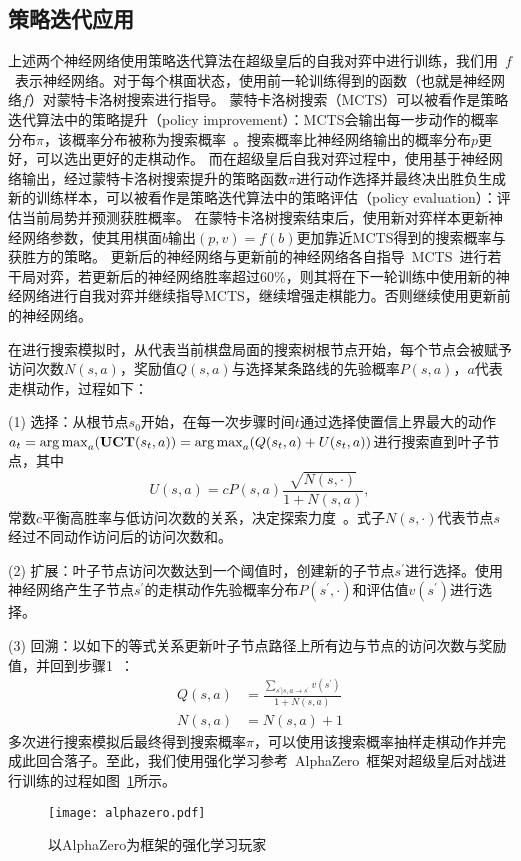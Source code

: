 \subsection{策略迭代应用}
上述两个神经网络使用策略迭代算法在超级皇后的自我对弈中进行训练，我们用~$f$~表示神经网络。对于每个棋面状态，使用前一轮训练得到的函数（也就是神经网络$f$）对蒙特卡洛树搜索进行指导。
蒙特卡洛树搜索（MCTS）可以被看作是策略迭代算法中的策略提升（policy improvement）：MCTS会输出每一步动作的概率分布$\pi$，该概率分布被称为搜索概率~\cite{silver2009reinforcement}。搜索概率比神经网络输出的概率分布$p$更好，可以选出更好的走棋动作。
而在超级皇后自我对弈过程中，使用基于神经网络输出，经过蒙特卡洛树搜索提升的策略函数$\pi$进行动作选择并最终决出胜负生成新的训练样本，可以被看作是策略迭代算法中的策略评估（policy evaluation）：评估当前局势并预测获胜概率。
在蒙特卡洛树搜索结束后，使用新对弈样本更新神经网络参数，使其用棋面$b$输出$(p,v)=f(b)$更加靠近MCTS得到的搜索概率与获胜方的策略。
更新后的神经网络与更新前的神经网络各自指导~MCTS~进行若干局对弈，若更新后的神经网络胜率超过$60\%$，则其将在下一轮训练中使用新的神经网络进行自我对弈并继续指导MCTS，继续增强走棋能力。否则继续使用更新前的神经网络。

在进行搜索模拟时，从代表当前棋盘局面的搜索树根节点开始，每个节点会被赋予访问次数$N(s,a)$，奖励值$Q(s,a)$与选择某条路线的先验概率$P(s,a)$，$a$代表走棋动作，过程如下：

(1) 选择：从根节点$s_{0}$开始，在每一次步骤时间$t$通过选择使置信上界最大的动作$a_{t} =  \mathop{\operatorname*{\arg\max}}_{a} (\textbf{UCT}(s_{t},a)) =  \mathop{\operatorname*{\arg\max}}_{a} (Q(s_{t},a) + U(s_{t},a))$进行搜索直到叶子节点，其中
\begin{equation*}
    U(s,a) = cP(s,a)\frac{\sqrt{N(s,\cdot)}}{1+N(s,a)},
\end{equation*}
常数$c$平衡高胜率与低访问次数的关系，决定探索力度~\cite{rosin2011multi}。式子$N(s,\cdot)$代表节点$s$经过不同动作访问后的访问次数和。

(2) 扩展：叶子节点访问次数达到一个阈值时，创建新的子节点$s^{\prime}$进行选择。使用神经网络产生子节点$s^{\prime}$的走棋动作先验概率分布$P(s^{\prime},\cdot)$和评估值$v(s^{\prime})$进行选择。

(3) 回溯：以如下的等式关系更新叶子节点路径上所有边与节点的访问次数与奖励值，并回到步骤1~\cite{segal2010scalability}：
\begin{equation*}
    \begin{aligned}
    Q(s,a) &= \frac{\sum_{s^{\prime}|s,a\rightarrow s^{\prime}}v(s^{\prime})}{1+N(s,a)} \\
    N(s,a) &= N(s,a) + 1 
    \end{aligned}
\end{equation*}
多次进行搜索模拟后最终得到搜索概率$\pi$，可以使用该搜索概率抽样走棋动作并完成此回合落子。至此，我们使用强化学习参考~AlphaZero~框架对超级皇后对战进行训练的过程如图~\ref{fig:az}所示。
\begin{figure}[!tb]
    \centering
    \texttt{[image: alphazero.pdf]}
    \caption[az]{%
    以AlphaZero为框架的强化学习玩家~\cite{Silver2017}%
      }
    \label{fig:az}
\end{figure}


